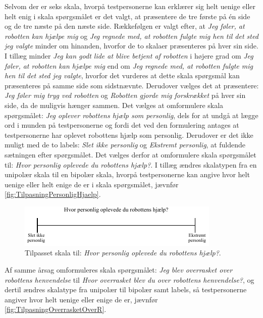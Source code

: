 \noindent
%
Selvom der er seks skala, hvorpå testpersonerne kan erklærer sig helt uenige eller helt enig i skala spørgsmålet er det valgt, at præsentere de tre første på én side og de tre næste på den næste side. Rækkefølgen er valgt efter, at \textit{Jeg føler, at robotten kan hjælpe mig} og \textit{Jeg regnede med, at robotten fulgte mig hen til det sted jeg valgte} minder om hinanden, hvorfor de to skalaer præsenteres på hver sin side. I tillæg minder \textit{Jeg kan godt lide at blive betjent af robotten} i højere grad om \textit{Jeg føler, at robotten kan hjælpe mig} end om \textit{Jeg regnede med, at robotten fulgte mig hen til det sted jeg valgte}, hvorfor det vurderes at dette skala spørgsmål kan præsenteres på samme side som sidstnævnte. Derudover vælges det at præsentere: \textit{Jeg føler mig tryg ved robotten} og \textit{Robotten gjorde mig forskrækket} på hver sin side, da de muligvis hænger sammen. \blankline
%
Det vælges at omformulere skala spørgsmålet: \textit{Jeg oplever robottens hjælp som personlig}, dels for at undgå at lægge ord i munden på testpersonerne og fordi det ved den formulering antages at testpersonerne har oplevet robottens hjælp som personlig. Derudover er det ikke muligt med de to labels: \textit{Slet ikke personlig} og \textit{Ekstremt personlig}, at fuldende sætningen efter spørgsmålet. Det vælges derfor at omformulere skala spørgsmålet til: \textit{Hvor personlig oplevede du robottens hjælp?}. I tillæg ændres skalatypen fra en unipolær skala til en bipolær skala, hvorpå testpersonerne kan angive hvor helt uenige eller helt enige de er i skala spørgsmålet, jævnfør \autoref{fig:TilpasningPersonligHjaelp}. 
%
\begin{figure}[H]
\centering
\includegraphics[width =\textwidth]{Figure/TilpasningAfSkalaer/TilpassetPersonligHjaelp} 
\caption{Tilpasset skala til: \textit{Hvor personlig oplevede du robottens hjælp?}.}
\label{fig:TilpasningPersonligHjaelp}
\end{figure}
\noindent
%
Af samme årsag omformuleres skala spørgsmålet: \textit{Jeg blev overrasket over robottens henvendelse} til \textit{Hvor overrasket blev du over robottens henvendelse?}, og dertil ændres skalatype fra unipolær til bipolær samt labels, så testpersonerne angiver hvor helt uenige eller enige de er, jævnfør \autoref{fig:TilpasningOverrasketOverR}. 
